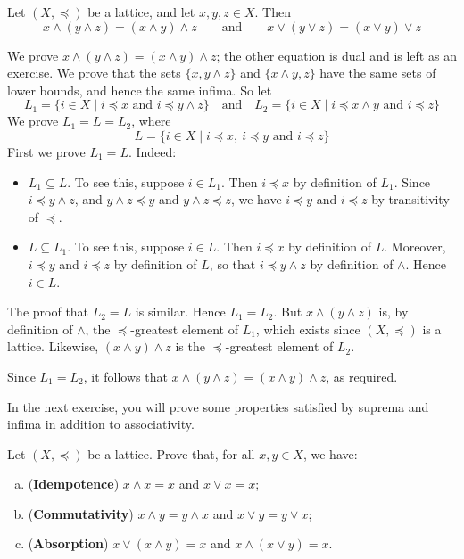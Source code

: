 \begin{proposition}
\label{propInfDistributesOverSup}
Let $(X, \preceq)$ be a lattice, and let $x,y,z \in X$. Then
\[ x \wedge (y \wedge z) = (x \wedge y) \wedge z \qquad \text{and} \qquad x \vee (y \vee z) = (x \vee y) \vee z \]
\end{proposition}
\begin{cproof}
We prove $x \wedge (y \wedge z) = (x \wedge y) \wedge z$; the other equation is dual and is left as an exercise. We prove that the sets $\{ x, y \wedge z \}$ and $\{ x \wedge y, z \}$ have the same sets of lower bounds, and hence the same infima. So let
\[ L_1 = \{ i \in X \mid i \preceq x \text{ and } i \preceq y \wedge z \} \quad \text{and} \quad L_2 = \{ i \in X \mid i \preceq x \wedge y \text{ and } i \preceq z \} \]
We prove $L_1 = L = L_2$, where
\[ L = \{ i \in X \mid i \preceq x,\ i \preceq y \text{ and } i \preceq z \} \]
First we prove $L_1 = L$. Indeed:
\begin{itemize}
\item $L_1 \subseteq L$. To see this, suppose $i \in L_1$. Then $i \preceq x$ by definition of $L_1$. Since $i \preceq y \wedge z$, and $y \wedge z \preceq y$ and $y \wedge z \preceq z$, we have $i \preceq y$ and $i \preceq z$ by transitivity of $\preceq$.
\item $L \subseteq L_1$. To see this, suppose $i \in L$. Then $i \preceq x$ by definition of $L$. Moreover, $i \preceq y$ and $i \preceq z$ by definition of $L$, so that $i \preceq y \wedge z$ by definition of $\wedge$. Hence $i \in L$.
\end{itemize}
The proof that $L_2 = L$ is similar. Hence $L_1=L_2$. But $x \wedge (y \wedge z)$ is, by definition of $\wedge$, the $\preceq$-greatest element of $L_1$, which exists since $(X, \preceq)$ is a lattice. Likewise, $(x \wedge y) \wedge z$ is the $\preceq$-greatest element of $L_2$.

Since $L_1=L_2$, it follows that $x \wedge (y \wedge z) = (x \wedge y) \wedge z$, as required.
\end{cproof}

In the next exercise, you will prove some properties satisfied by suprema and infima in addition to associativity.

\begin{exercise}
Let $(X, \preceq)$ be a lattice. Prove that, for all $x,y \in X$, we have:
\begin{enumerate}[(a)]
\item (\textbf{Idempotence}) $x \wedge x = x$ and $x \vee x = x$;
\item (\textbf{Commutativity}) $x \wedge y = y \wedge x$ and $x \vee y = y \vee x$;
\item (\textbf{Absorption}) $x \vee (x \wedge y) = x$ and $x \wedge (x \vee y) = x$.
\end{enumerate}
\end{exercise}

